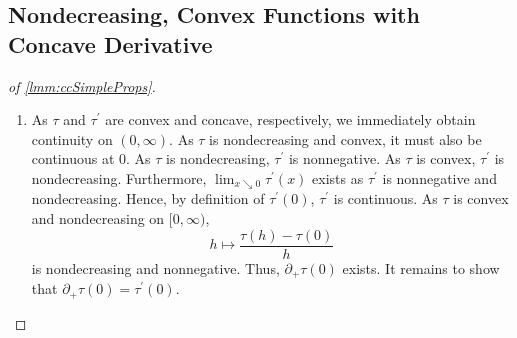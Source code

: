 \documentclass{article}
\newcommand{\Rp}{[0, \infty)} %
\newcommand{\Rpp}{(0, \infty)} %
\newcommand{\pr}{^\prime}
\newcommand{\tran}{\tau}
\newcommand{\dtran}{\tran\pr}
\begin{document}
\begin{appendix}
\subsection{Nondecreasing, Convex Functions with Concave Derivative}\label{app:aux:cc}
%
%
\begin{proof}[of \cref{lmm:ccSimpleProps}]
	\begin{enumerate}[label=(\roman*)]
		\item 
		As $\tran$ and $\dtran$ are convex and concave, respectively, we immediately obtain continuity on $\Rpp$. As $\tran$ is nondecreasing and convex, it must also be continuous at $0$.
		As $\tran$ is nondecreasing, $\dtran$ is nonnegative. As $\tran$ is convex, $\dtran$ is nondecreasing.
		Furthermore, $\lim_{x\searrow0} \dtran(x)$ exists as $\dtran$ is nonnegative and nondecreasing.
		Hence, by definition of $\dtran(0)$, $\dtran$ is continuous.
		As $\tran$ is convex and nondecreasing on $\Rp$,
		\begin{equation}
			h\mapsto \frac{\tran(h)-\tran(0)}{h}
		\end{equation}
		is nondecreasing and nonnegative. Thus, $\partial_+ \tran(0)$ exists. 
		It remains to show that $\partial_+ \tran(0) = \dtran(0)$.
		

\end{enumerate}
\end{proof}
\end{appendix}
\end{document}
